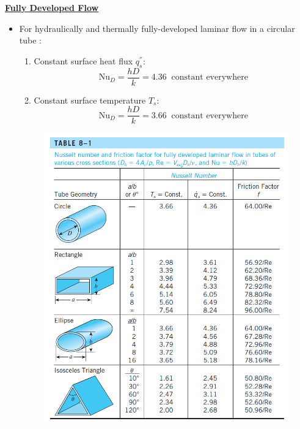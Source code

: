 \textbf{\underline{\large Fully Developed Flow}}
\begin{itemize}
    \item For hydraulically and thermally fully-developed \color{blue} laminar flow \color{black} in a \color{blue} circular tube \color{black}:
    \begin{enumerate}
        \item Constant surface heat flux $q_{s}^{''}$:
        \begin{equation*}
            \text{Nu}_D = \frac{hD}{k} = 4.36 \; \; \text{constant everywhere}
        \end{equation*}
        \item Constant surface temperature $T_s$:
        \begin{equation*}
            \text{Nu}_D = \frac{hD}{k} = 3.66 \;\;\text{constant everywhere}
        \end{equation*}
    \end{enumerate}
    \begin{figure}[H]
            \centering
            \includegraphics[width=1.0\linewidth]{images/Table_8_1.png}

\end{figure}
\end{itemize}
